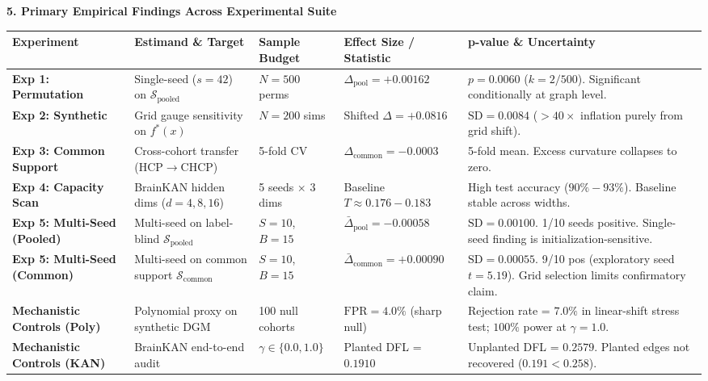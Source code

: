 \documentclass[9pt]{article}
\begin{document}
\textbf{\large 5. Primary Empirical Findings Across Experimental Suite}\\[1pt]
\begin{table}[h!]
\centering
\scriptsize
\begin{tabularx}{\textwidth}{l p{3.0cm} l l X}
\toprule
\textbf{Experiment} & \textbf{Estimand \& Target} & \textbf{Sample Budget} & \textbf{Effect Size / Statistic} & \textbf{p-value \& Uncertainty} \\
\midrule
\textbf{Exp 1: Permutation} & Single-seed ($s=42$) on $\mathcal{S}_{\mathrm{pooled}}$ & $N=500$ perms & $\Delta_{\mathrm{pool}} = +0.00162$ & $p = 0.0060$ ($k=2/500$). Significant conditionally at graph level. \\
\textbf{Exp 2: Synthetic} & Grid gauge sensitivity on $f^*(x)$ & $N=200$ sims & Shifted $\Delta = +0.0816$ & $\mathrm{SD}=0.0084$ ($>40\times$ inflation purely from grid shift). \\
\textbf{Exp 3: Common Support} & Cross-cohort transfer (HCP$\to$CHCP) & 5-fold CV & $\Delta_{\mathrm{common}} = -0.0003$ & 5-fold mean. Excess curvature collapses to zero. \\
\textbf{Exp 4: Capacity Scan} & BrainKAN hidden dims ($d=4, 8, 16$) & 5 seeds $\times$ 3 dims & Baseline $T \approx 0.176 - 0.183$ & High test accuracy ($90\%-93\%$). Baseline stable across widths. \\
\textbf{Exp 5: Multi-Seed (Pooled)} & Multi-seed on label-blind $\mathcal{S}_{\mathrm{pooled}}$ & $S=10$, $B=15$ & $\bar{\Delta}_{\mathrm{pool}} = \mathbf{-0.00058}$ & $\mathrm{SD}=0.00100$. 1/10 seeds positive. Single-seed finding is initialization-sensitive. \\
\textbf{Exp 5: Multi-Seed (Common)} & Multi-seed on common support $\mathcal{S}_{\mathrm{common}}$ & $S=10$, $B=15$ & $\bar{\Delta}_{\mathrm{common}} = \mathbf{+0.00090}$ & $\mathrm{SD}=0.00055$. 9/10 pos (exploratory seed $t=5.19$). Grid selection limits confirmatory claim. \\
\textbf{Mechanistic Controls (Poly)} & Polynomial proxy on synthetic DGM & 100 null cohorts & $\mathrm{FPR} = 4.0\%$ (sharp null) & Rejection rate = $7.0\%$ in linear-shift stress test; $100\%$ power at $\gamma=1.0$. \\
\textbf{Mechanistic Controls (KAN)} & BrainKAN end-to-end audit & $\gamma \in \{0.0, 1.0\}$ & Planted DFL = $0.1910$ & Unplanted DFL = $0.2579$. Planted edges not recovered ($0.191 < 0.258$). \\
\bottomrule
\end{tabularx}
\end{table}
\vspace{-8pt}
\end{document}
